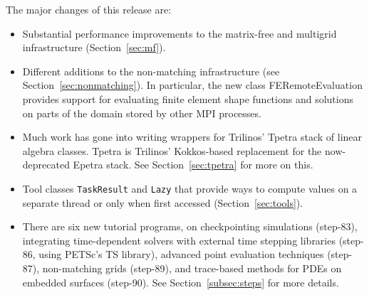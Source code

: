 \documentclass{ansarticle-preprint}
\begin{document}
The major changes of this release are:
%
\begin{itemize}
  \item Substantial performance improvements to the matrix-free and multigrid
   infrastructure (Section~\ref{sec:mf}).
  \item Different additions to the non-matching infrastructure (see
    Section~\ref{sec:nonmatching}). In particular, the new class
    FERemoteEvaluation provides support for evaluating
    finite element shape functions and solutions on parts of the
    domain stored by other MPI processes.
  \item Much work has gone into writing wrappers for Trilinos' Tpetra
    stack of linear algebra classes. Tpetra is Trilinos' Kokkos-based
    replacement for the now-deprecated Epetra stack. See
    Section~\ref{sec:tpetra} for more on this.
  \item Tool classes \texttt{TaskResult} and \texttt{Lazy} that provide ways to compute
    values on a separate thread or only when first accessed (Section~\ref{sec:tools}).
  \item There are six new tutorial programs, on checkpointing simulations
    (step-83), integrating time-dependent solvers with external time
    stepping libraries (step-86, using PETSc's TS library), advanced
    point evaluation techniques (step-87), non-matching grids
    (step-89), and trace-based methods for PDEs on embedded surfaces
    (step-90). See Section~\ref{subsec:steps} for more details.
\end{itemize}
%

\end{document}

